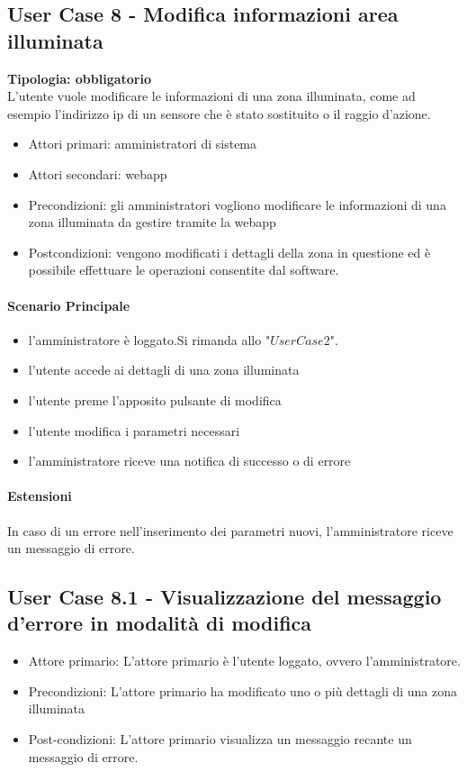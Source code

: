 \documentclass[12pt]{article}
\begin{document}
\subsection{User Case 8 - Modifica informazioni area illuminata}
\textbf{Tipologia: obbligatorio} \\
L'utente vuole modificare le informazioni di una zona illuminata, come ad esempio l'indirizzo ip di un sensore che è stato sostituito o il raggio d'azione.
\begin{itemize}
	\item Attori primari: amministratori di sistema
	\item Attori secondari: webapp
	\item Precondizioni: gli amministratori vogliono modificare le informazioni di una  zona illuminata da gestire tramite la webapp
	\item Postcondizioni: vengono modificati i dettagli della zona in questione ed è possibile effettuare le operazioni consentite dal software.
\end{itemize}
\paragraph{Scenario Principale}
\begin{itemize}
	\item l'amministratore è loggato.Si rimanda allo "$User Case 2$".
	\item l'utente accede ai dettagli di una zona illuminata
	\item l'utente preme l'apposito pulsante di modifica
	\item l'utente modifica i parametri necessari
	\item l'amministratore riceve una notifica di successo o di errore
\end{itemize}
\paragraph{Estensioni} In caso di un errore nell'inserimento dei parametri nuovi, l'amministratore riceve un messaggio di errore.

\subsection{User Case 8.1 - Visualizzazione del messaggio d'errore in modalità di modifica}
\begin{itemize}
	\item Attore primario: L'attore primario è l'utente loggato, ovvero l'amministratore.
	\item Precondizioni: L'attore primario ha modificato uno o più dettagli di una zona illuminata
	\item Post-condizioni: L'attore primario visualizza un messaggio recante un messaggio di errore.
\end{itemize}
\end{document}
